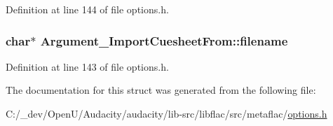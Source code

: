Definition at line 144 of file options.\+h.

\subsubsection[{\texorpdfstring{filename}{filename}}]{\setlength{\rightskip}{0pt plus 5cm}char$\ast$ Argument\+\_\+\+Import\+Cuesheet\+From\+::filename}\hypertarget{struct_argument___import_cuesheet_from_adbf024a1344ecbdedf7a2fd5418b4350}{}\label{struct_argument___import_cuesheet_from_adbf024a1344ecbdedf7a2fd5418b4350}


Definition at line 143 of file options.\+h.



The documentation for this struct was generated from the following file\+:\begin{DoxyCompactItemize}
\item 
C\+:/\+\_\+dev/\+Open\+U/\+Audacity/audacity/lib-\/src/libflac/src/metaflac/\hyperlink{libflac_2src_2metaflac_2options_8h}{options.\+h}\end{DoxyCompactItemize}
